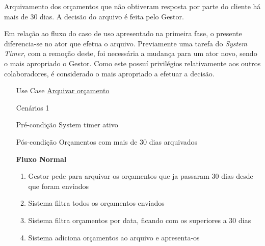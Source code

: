 \documentclass[../relatorio.tex]{subfiles}
\begin{document}
Arquivamento dos orçamentos que não obtiveram resposta por parte do cliente há mais de 30 dias.
A decisão do arquivo é feita pelo Gestor.

Em relação ao fluxo do caso de uso apresentado na primeira fase, o presente diferencia-se no ator 
que efetua o arquivo. 
Previamente uma tarefa do \textit{System Timer}, com a remoção deste, foi necessária a mudança para 
um ator novo, sendo o mais apropriado o Gestor.
Como este possuí privilégios relativamente aos outros colaboradores, é considerado o mais apropriado 
a efetuar a decisão.

\begin{itemize}
    \item[Use Case] {\underline{Arquivar orçamento}}
    \item[Cenários] {1}
    \item[Pré-condição] {System timer ativo}
    \item[Pós-condição] {Orçamentos com mais de 30 dias arquivados}
          \begin{flushleft}
              \textbf{Fluxo Normal}
          \end{flushleft}
          \begin{enumerate}
              \item Gestor pede para arquivar os orçamentos que ja passaram 30 dias desde que foram enviados
              \item Sistema filtra todos os orçamentos enviados
              \item Sistema filtra orçamentos por data, ficando com os superiores a 30 dias
              \item Sistema adiciona orçamentos ao arquivo e apresenta-os
          \end{enumerate}
\end{itemize}
\end{document}
